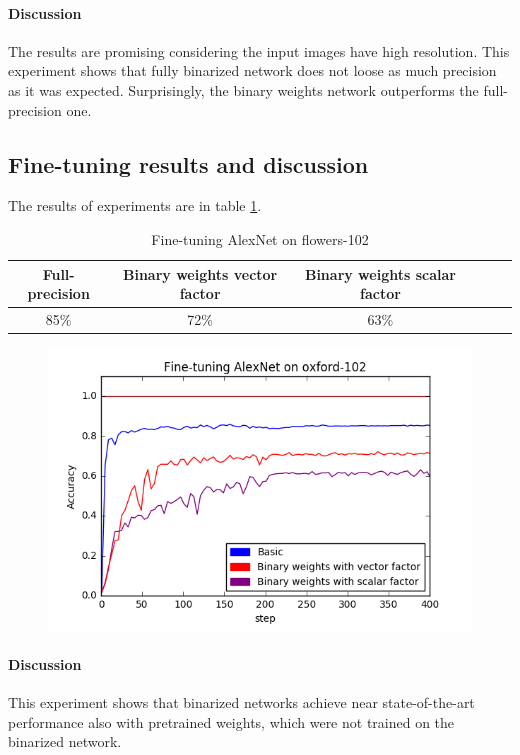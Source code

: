 \documentclass[licencjacka]{pracamgr}
\begin{document}
		        \paragraph{Discussion} 
                        The results are promising considering the input images have high resolution. This experiment shows that fully binarized network does not loose as much precision as it was expected. Surprisingly, the binary weights network outperforms the full-precision one.
		\subsection{Fine-tuning results and discussion}
		     
		        The results of experiments are in table \ref{table:1}.
		        \begin{table}[H]
                    \caption{Fine-tuning AlexNet on flowers-102}
                    \centering
                    \begin{tabular}{c c c c c c}
                    \hline\hline
			    Full-precision & Binary weights vector factor & Binary weights scalar factor \\ [0.5ex]
                    \hline
			    85\% & 72\% & 63\% \\
                    \hline
                    \end{tabular}
                    \label{table:1}
	            \end{table}
	            \begin{figure}[h]
				\centering
				\includegraphics[width=\textwidth]{images/Fine-tuning-AlexNet}
		    \end{figure}
		        \paragraph{Discussion} 
			This experiment shows that binarized networks achieve near state-of-the-art performance also with pretrained weights, which were not trained on the binarized network.
\end{document}
